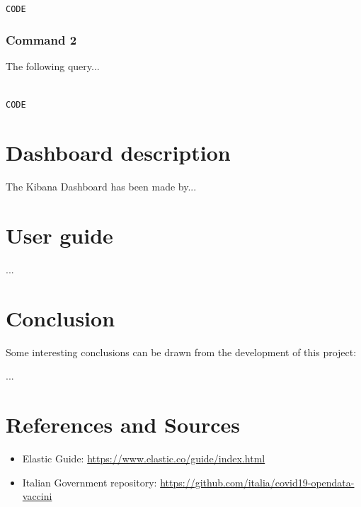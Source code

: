 \documentclass{article}
\begin{document}
\begin{lstlisting}[language=cypher, label=lst:cypher-example]

CODE

\end{lstlisting}
\subsubsection{Command 2}
The following query...

\begin{lstlisting}[language=cypher, label=lst:cypher-example]

CODE

\end{lstlisting}
\newpage

\section{Dashboard description}
The Kibana Dashboard has been made by...

\newpage

\section{User guide}
...

\section{Conclusion}

Some interesting conclusions can be drawn from the development of this project:

...

\section{References and Sources}
\begin{itemize}
    \item Elastic Guide: \url{https://www.elastic.co/guide/index.html}
    \item Italian Government repository: \url{https://github.com/italia/covid19-opendata-vaccini}
    
\end{itemize}
\end{document}
